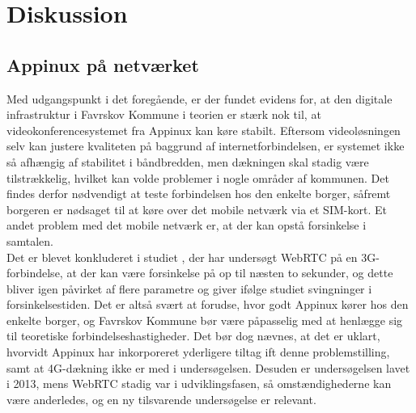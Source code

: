 \section{Diskussion}
\subsection{Appinux på netværket}
Med udgangspunkt i det foregående, er der fundet evidens for, at den digitale infrastruktur i Favrskov Kommune i teorien er stærk nok til, at videokonferencesystemet fra Appinux kan køre stabilt. Eftersom videoløsningen selv kan justere kvaliteten på baggrund af internetforbindelsen, er systemet ikke så afhængig af stabilitet i båndbredden, men dækningen skal stadig være tilstrækkelig, hvilket kan volde problemer i nogle områder af kommunen. Det findes derfor nødvendigt at teste forbindelsen hos den enkelte borger, såfremt borgeren er nødsaget til at køre over det mobile netværk via et SIM-kort. Et andet problem med det mobile netværk er, at der kan opstå forsinkelse i samtalen.\\
Det er blevet konkluderet i studiet  \parencite{webrtcjournal}, der har undersøgt WebRTC på en 3G-forbindelse, at der kan være forsinkelse på op til næsten to sekunder, og dette bliver igen påvirket af flere parametre og giver ifølge studiet svingninger i forsinkelsestiden. Det er altså svært at forudse, hvor godt Appinux kører hos den enkelte borger, og Favrskov Kommune bør være påpasselig med at henlægge sig til teoretiske forbindelseshastigheder. Det bør dog nævnes, at det er uklart, hvorvidt Appinux har inkorporeret yderligere tiltag ift denne problemstilling, samt at 4G-dækning ikke er med i undersøgelsen. Desuden er undersøgelsen lavet i 2013, mens WebRTC stadig var i udviklingsfasen, så omstændighederne kan være anderledes, og en ny tilsvarende undersøgelse er relevant.
